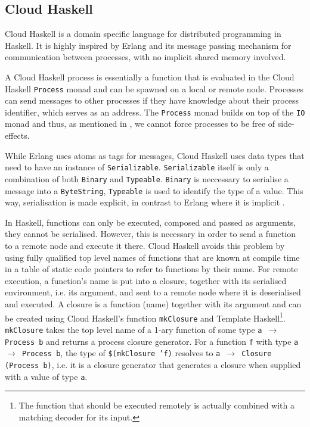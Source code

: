 \subsection{Cloud Haskell}
\label{chp:cloud_haskell}
\textsf{Cloud Haskell} \cite{Epstein:2011:THC:2034675.2034690} is a domain specific language for distributed programming in \textsf{Haskell}. It is highly inspired by \textsf{Erlang} and its message passing mechanism for communication between processes, with no implicit shared memory involved.

A \textsf{Cloud Haskell} process is essentially a function that is evaluated in the \textsf{Cloud Haskell} \texttt{Process} monad and can be spawned on a local or remote node. Processes can send messages to other processes if they have knowledge about their process identifier, which serves as an address. The \texttt{Process} monad builds on top of the \texttt{IO} monad and thus, as mentioned in , we cannot force processes to be free of side-effects.

While \textsf{Erlang} uses atoms as tags for messages, \textsf{Cloud Haskell} uses data types that need to have an instance of \texttt{Serializable}. \texttt{Serializable} itself is only a combination of both \texttt{Binary} and \texttt{Typeable}. \texttt{Binary} is neccessary to serialise a message into a \texttt{ByteString}, \texttt{Typeable} is used to identify the type of a value. This way, serialisation is made explicit, in contrast to \textsf{Erlang} where it is implicit \cite{Epstein:2011:THC:2034675.2034690}.

In \textsf{Haskell}, functions can only be executed, composed and passed as arguments, they cannot be serialised. However, this is necessary in order to send a function to a remote node and execute it there. \textsf{Cloud Haskell} avoids this problem by using fully qualified top level names of functions that are known at compile time in a table of static code pointers to refer to functions by their name. For remote execution, a function's name is put into a closure, together with its serialised environment, i.e. its argument, and sent to a remote node where it is deserialised and executed. A closure is a function (name) together with its argument \cite{Epstein:2011:THC:2034675.2034690} and can be created using \textsf{Cloud Haskell}'s function \texttt{mkClosure} and \textsf{Template Haskell}\footnote{The function that should be executed remotely is actually combined with a matching decoder for its input.}. \texttt{mkClosure} takes the top level name of a 1-ary function of some type \texttt{a \nolinebreak $\to$ Process b} and returns a process closure generator. For a function \texttt{f} with type \texttt{a \nolinebreak $\to$ \nolinebreak Process b}, the type of \texttt{\$(mkClosure 'f)} resolves to \texttt{a \nolinebreak $\to$ Closure (Process b)}, i.e. it is a closure generator that generates a closure when supplied with a value of type \texttt{a}.


